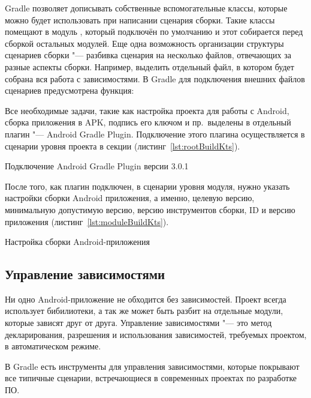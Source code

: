 Gradle позволяет дописывать собственные вспомогательные классы, которые можно будет использовать при написании сценария сборки.
Такие классы помещают в модуль , который подключён по умолчанию и этот собирается перед сборкой остальных модулей.
Еще одна возможность организации структуры сценариев сборки "--- разбивка сценария на несколько файлов, отвечающих за разные аспекты сборки.
Например, выделить отдельный файл, в котором будет собрана вся работа с зависимостями.
В Gradle для подключения внешних файлов сценариев предусмотрена функция:

Все необходимые задачи, такие как настройка проекта для работы с Android, сборка приложения в APK, подпись его ключом и пр.\ выделены в отдельный плагин "--- Android Gradle Plugin.
Подключение этого плагина осуществляется в сценарии уровня проекта в секции  (листинг~\ref{lst:rootBuildKts}).

\begin{listing}[H]
  \caption{Подключение Android Gradle Plugin версии 3.0.1}
  \label{lst:rootBuildKts}
\end{listing}

После того, как плагин подключен, в сценарии уровня модуля, нужно указать настройки сборки Android приложения, а именно, целевую версию, минимальную допустимую версию, версию инструментов сборки, ID и версию приложения (листинг~\ref{lst:moduleBuildKts}).

\begin{listing}[H]
  \caption{Настройка сборки Android-приложения}
  \label{lst:moduleBuildKts}
\end{listing}

\subsection{Управление зависимостями}
\label{subsec:libs}

Ни одно Android-приложение не обходится без зависимостей.
Проект всегда использует бибилиотеки, а так же может быть разбит на отдельные модули, которые зависят друг от друга.
Управление зависимостями "--- это метод декларирования, разрешения и использования зависимостей, требуемых проектом, в автоматическом режиме.

В Gradle есть инструменты для управления зависимостями, которые покрывают все типичные сценарии, встречающиеся в современных проектах по разработке ПО\@.

